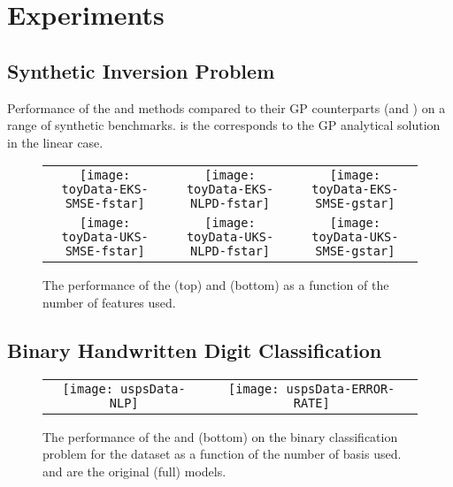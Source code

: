 \section{Experiments}

\subsection{Synthetic Inversion Problem}
%
\begin{table*}
\caption{Performance of the \eks and \uks methods compared to their GP counterparts (\egp and \ugp) on a range of synthetic benchmarks. 
\gp is the corresponds to the GP analytical solution in the linear case.
}
\begin{center}

\end{center}
\end{table*}
%
\begin{figure*}
\centering
\begin{tabular}{c c c}
\texttt{[image: toyData-EKS-SMSE-fstar]} &
\texttt{[image: toyData-EKS-NLPD-fstar]} &
\texttt{[image: toyData-EKS-SMSE-gstar]} \\
\texttt{[image: toyData-UKS-SMSE-fstar]} &
\texttt{[image: toyData-UKS-NLPD-fstar]} &
\texttt{[image: toyData-UKS-SMSE-gstar]} \\
\end{tabular}
\caption{The performance of the \eks (top) and \uks (bottom) as a function of the number of features used. }
\end{figure*}
%
\subsection{Binary Handwritten Digit Classification}
\begin{figure*}
\centering
\begin{tabular}{c c}
\texttt{[image: uspsData-NLP]}  &
\texttt{[image: uspsData-ERROR-RATE]}  
\end{tabular}
\caption{The performance of the \eks and \uks (bottom) on the binary classification problem for the \usps dataset as a function of 
the number of  basis used. \egp and \ugp are the original (full) \gp models.}
\end{figure*}
%
%

